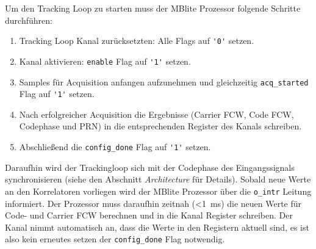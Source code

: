 Um den Tracking Loop zu starten muss der MBlite Prozessor folgende Schritte durchführen:

\begin{enumerate}
 \label{TLStartProzedur}
    \item Tracking Loop Kanal zurücksetzten: Alle Flags auf \lstinline$'0'$ setzen.
    \item Kanal aktivieren: \lstinline$enable$ Flag auf \lstinline$'1'$ setzen.
    \item Samples für Acquisition anfangen aufzunehmen und gleichzeitig \lstinline$acq_started$ Flag auf \lstinline$'1'$ setzen.
    \item Nach erfolgreicher Acquisition die Ergebnisse (Carrier FCW, Code FCW, Codephase und PRN) in die entsprechenden Register des Kanals schreiben.
    \item Abschließend die \lstinline$config_done$ Flag auf \lstinline$'1'$ setzen.
\end{enumerate}

Daraufhin wird der Trackingloop sich mit der Codephase des Eingangssignals synchronisieren (siehe den Abschnitt \emph{Architecture} für Details). Sobald neue Werte an den Korrelatoren vorliegen wird der MBlite Prozessor über die \lstinline$o_intr$ Leitung informiert. Der Prozessor muss daraufhin zeitnah (\SI{<1}{\milli\second}) die neuen Werte für Code- und Carrier FCW berechnen und in die Kanal Register schreiben. Der Kanal nimmt automatisch an, dass die Werte in den Registern aktuell sind, es ist also kein erneutes setzen der \lstinline$config_done$ Flag notwendig.

